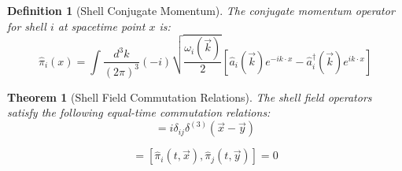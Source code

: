 \documentclass[12pt,a4paper]{article}
\newtheorem{theorem}{Theorem}[section]
\newtheorem{definition}{Definition}[section]
\begin{document}
\begin{definition}[Shell Conjugate Momentum]
\label{def:conjugate-momentum}
The conjugate momentum operator for shell $i$ at spacetime point $x$ is:
\begin{equation}
\hat{\pi}_i(x) = \int \frac{d^3k}{(2\pi)^3} (-i) \sqrt{\frac{\omega_i(\vec{k})}{2}} \left[\hat{a}_i(\vec{k})e^{-ik \cdot x} - \hat{a}_i^{\dagger}(\vec{k})e^{ik \cdot x}\right]
\end{equation}
\end{definition}

\begin{theorem}[Shell Field Commutation Relations]
\label{thm:field-commutation}
The shell field operators satisfy the following equal-time commutation relations:
\begin{equation}
[\hat{\phi}_i(t, \vec{x}), \hat{\pi}_j(t, \vec{y})] = i\delta_{ij}\delta^{(3)}(\vec{x} - \vec{y})
\end{equation}

\begin{equation}
[\hat{\phi}_i(t, \vec{x}), \hat{\phi}_j(t, \vec{y})] = [\hat{\pi}_i(t, \vec{x}), \hat{\pi}_j(t, \vec{y})] = 0
\end{equation}
\end{theorem}
\end{document}
